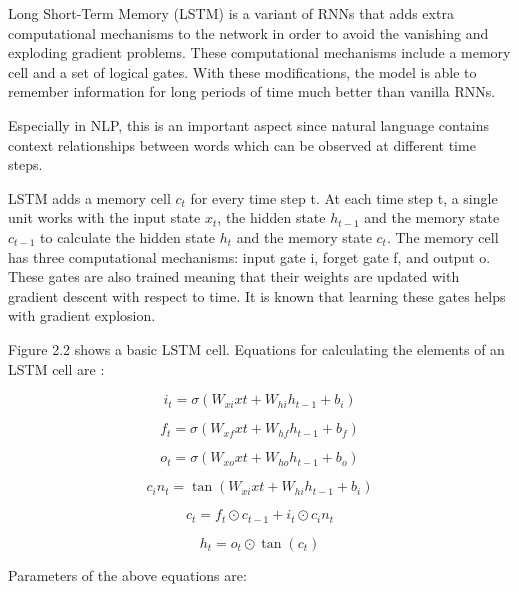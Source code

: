 Long Short-Term Memory (LSTM) is a variant of RNNs that adds extra computational mechanisms to the network in order to avoid the vanishing and exploding gradient problems. These computational mechanisms include a memory cell and a set of logical gates. With these modifications, the model is able to remember information for long periods of time much better than vanilla RNNs.

Especially in NLP, this is an important aspect since natural language contains context relationships between words which can be observed at different time steps. 

LSTM adds a memory cell $c_{t}$ for every time step t. At each time step t, a single unit works with the input state $x_{t}$, the hidden state $h_{t-1}$ and the memory state $c_{t-1}$ to calculate the hidden state $h_{t}$ and the memory state $c_{t}$. The memory cell has three computational mechanisms: input gate i, forget gate f, and output o. These gates are also trained meaning that their weights are updated with gradient descent with respect to time. It is known that learning these gates helps with gradient explosion.

Figure 2.2 shows a basic LSTM cell. Equations for calculating the elements of an LSTM cell are \cite{paszke}:

\begin{equation}
i_{t} = \sigma(W_{xi}xt + W_{hi}h_{t-1} + b_{i})
\end{equation}

\begin{equation}
f_{t} = \sigma(W_{xf}xt + W_{hf}h_{t-1} + b_{f})
\end{equation}

\begin{equation}
o_{t} = \sigma(W_{xo}xt + W_{ho}h_{t-1} + b_{o})
\end{equation}

\begin{equation}
c_in_{t} = \tan(W_{xi}xt + W_{hi}h_{t-1} + b_{i})
\end{equation}

\begin{equation}
c_{t} = f_{t} \odot c_{t-1} + i_{t} \odot c_in_{t}
\end{equation}

\begin{equation}
h_{t} = o_{t} \odot \tan(c_{t}) 
\end{equation}

Parameters of the above equations are:

